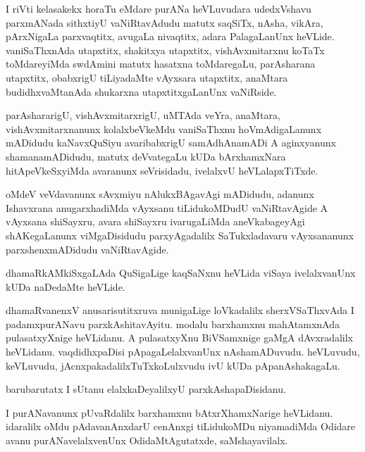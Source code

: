 \documentclass{article}
\begin{document}
\begin{mn}
I riVti kelasakekx horaTu eMdare purANa heVLuvudara udedxVshavu
parxmANada sithxtiyU vaNiRtavAdudu matutx saqSiTx, nAsha, vikAra,
pArxNigaLa parxvaqtitx, avugaLa nivaqtitx, adara PalagaLanUnx
heVLide. vaniSaThxnAda utapxtitx, shakitxya utapxtitx, vishAvxmitarxnu
koTaTx toMdareyiMda swdAmini matutx hasatxna toMdaregaLu, parAsharana
utapxtitx, obabxrigU tiLiyadaMte vAyxsara utapxtitx, anaMtara
budidhxvaMtanAda shukarxna utapxtitxgaLanUnx vaNiRside.
\end{mn}

\begin{mn}%
parAshararigU, vishAvxmitarxrigU, uMTAda veYra, anaMtara,
vishAvxmitarxnanunx kolalxbeVkeMdu vaniSaThxnu hoVmAdigaLanunx
mADidudu kaNavxQuSiyu avaribabxrigU samAdhAnamADi A aginxyanunx
shamanamADidudu, matutx deVvategaLu kUDa bArxhamxNara hitApeVkeSxyiMda
avaranunx seVrisidadu, ivelalxvU heVLalapxTiTxde.
\end{mn}

\begin{mn}%
oMdeV veVdavanunx sAvxmiyu nAlukxBAgavAgi mADidudu, adanunx Ishavxrana
anugarxhadiMda vAyxsanu tiLidukoMDudU vaNiRtavAgide A vAyxsana
shiSayxru, avara shiSayxru ivarugaLiMda aneVkabageyAgi shAKegaLanunx
viMgaDisidudu parxyAgadalilx SaTukxladavaru vAyxsananunx
parxshenxmADidudu vaNiRtavAgide.
\end{mn}

\begin{mn}%
dhamaRkAMkiSxgaLAda QuSigaLige kaqSaNxnu heVLida viSaya ivelalxvanUnx
kUDa naDedaMte heVLide.
\end{mn}

\begin{mn}
dhamaRvanenxV anusarisutitxruva munigaLige loVkadalilx sherxVSaThxvAda
I padamxpurANavu parxkAshitavAyitu. modalu barxhamxnu mahAtamxnAda
pulasatxyXnige heVLidanu. A pulasatxyXnu BiVSamxnige gaMgA
dAvxradalilx heVLidanu. vaqdidhxpaDisi pApagaLelalxvanUnx
nAshamADuvudu. heVLuvudu, keVLuvudu, jAcnxpakadalilxTuTxkoLulxvudu ivU
kUDa pApanAshakagaLu.
\end{mn}

\begin{mn}%
barubarutatx I sUtanu elalxkaDeyalilxyU parxkAshapaDisidanu.
\end{mn}

\begin{mn}
I purANavanunx pUvaRdalilx barxhamxnu bAtxrXhamxNarige
heVLidanu. idaralilx oMdu pAdavanAnxdarU cenAnxgi tiLidukoMDu
niyamadiMda Odidare avanu purANavelalxvenUnx OdidaMtAgutatxde, saMshayavilalx.
\end{mn}
\end{document}
